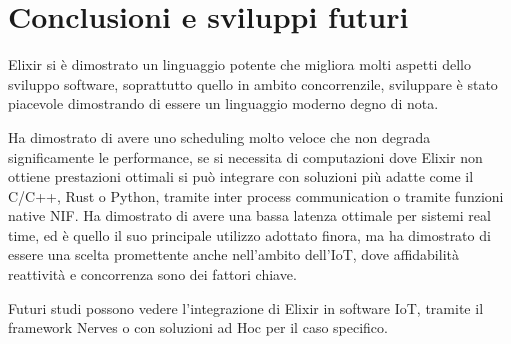 \chapter*{Conclusioni e sviluppi futuri}

\setlength{\parindent}{0pt}

Elixir si è dimostrato un linguaggio potente che
migliora molti aspetti dello sviluppo software,
soprattutto quello in ambito concorrenzile, sviluppare
è stato piacevole dimostrando di essere un linguaggio
moderno degno di nota.
\vspace{1.5em}

Ha dimostrato di avere uno scheduling molto
veloce che non degrada significamente le performance,
se si necessita di computazioni dove Elixir non
ottiene prestazioni ottimali 
si può integrare con 
soluzioni più adatte come il C/C++, Rust o Python, tramite
inter process communication o tramite funzioni native NIF.
Ha dimostrato di avere una bassa latenza ottimale per
sistemi real time, ed è quello il suo principale utilizzo
adottato finora, ma ha dimostrato di essere una scelta promettente
anche nell'ambito dell'IoT, dove affidabilità reattività 
e concorrenza sono dei fattori chiave.
\vspace{1.5em}

Futuri studi possono vedere l'integrazione di Elixir
in software IoT, tramite il framework Nerves o con
soluzioni ad Hoc per il caso specifico.